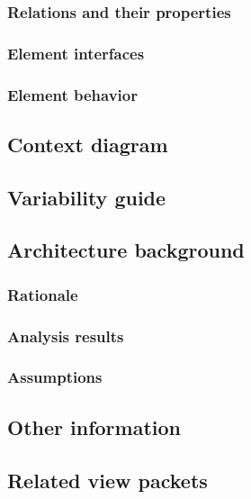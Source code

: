 \documentclass[a4paper,10pt]{book}
\begin{document}
\subsubsection{Relations and their properties}

\subsubsection{Element interfaces}

\subsubsection{Element behavior}

\subsection{Context diagram}

\subsection{Variability guide}

\subsection{Architecture background}

\subsubsection{Rationale}

\subsubsection{Analysis results}

\subsubsection{Assumptions}

\subsection{Other information}

\subsection{Related view packets}
\end{document}
